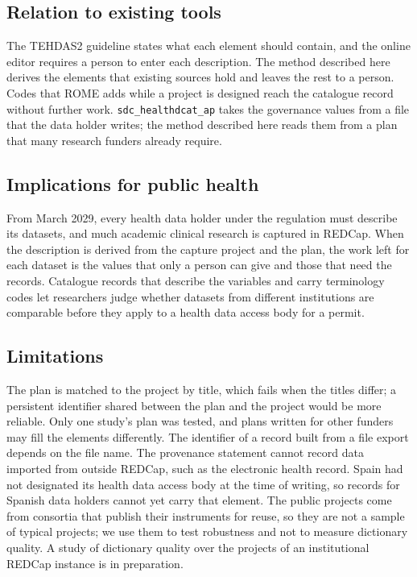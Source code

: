 \documentclass[12pt]{article}
\newcommand{\code}[1]{\texttt{#1}}
\begin{document}
\subsection{Relation to existing tools}

The TEHDAS2 guideline states what each element should contain, and the online editor
requires a person to enter each description.\citep{tehdas2d51,hipeditor} The method
described here derives the elements that existing sources hold and leaves the rest to a
person. Codes that ROME adds while a project is designed reach the catalogue record
without further work.\citep{meigen2026rome} \code{sdc\_healthdcat\_ap} takes the
governance values from a file that the data holder writes;\citep{sdchealthdcat} the
method described here reads them from a plan that many research funders already require.

\subsection{Implications for public health}

From March 2029, every health data holder under the regulation must describe its datasets,
and much academic clinical research is captured in REDCap. When the description is derived
from the capture project and the plan, the work left for each dataset is the values that
only a person can give and those that need the records. Catalogue records that describe the variables and carry terminology codes
let researchers judge whether datasets from different institutions are comparable before
they apply to a health data access body for a permit.

\subsection{Limitations}

The plan is matched to the project by title, which fails when the
titles differ; a persistent identifier shared between the plan and the project would be
more reliable. Only one study's plan was tested, and plans written for other funders may fill the
elements differently. The identifier of a record built from a
file export depends on the file name. The provenance statement cannot
record data imported from outside REDCap, such as the electronic health record. Spain had not
designated its health data access body at the time of writing,\citep{hdabes} so records
for Spanish data holders cannot yet carry that element. The public projects come from
consortia that publish their instruments for reuse, so they are not a sample of typical
projects; we use them to test robustness and not to measure dictionary quality. A study
of dictionary quality over the projects of an institutional REDCap instance is in
preparation.
\end{document}
